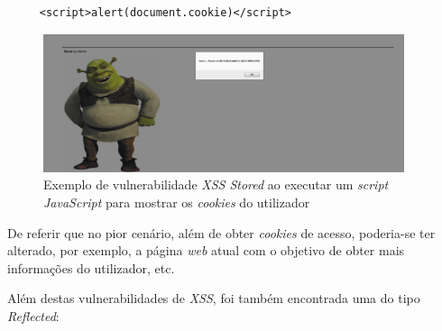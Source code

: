 \documentclass[10pt,english]{article}
\begin{document}
\begin{itemize}
    \begin{lstlisting}
     <script>alert(document.cookie)</script>
    \end{lstlisting}
    
    \begin{figure}[!h]
        \centering
        \includegraphics[width=400]{images/cookies.png}
        \caption{Exemplo de vulnerabilidade \textit{XSS Stored} ao executar um \textit{script} \textit{JavaScript} para mostrar os \textit{cookies} do utilizador}
    \end{figure}
    
    

    
    \par De referir que no pior cenário, além de obter \textit{cookies} de acesso, poderia-se ter alterado, por exemplo, a página \textit{web} atual com o objetivo de obter mais informações do utilizador, etc.
    
\end{itemize}

\clearpage

\par Além destas vulnerabilidades de \textit{XSS}, foi também encontrada uma do tipo \textit{Reflected}:
\end{document}

